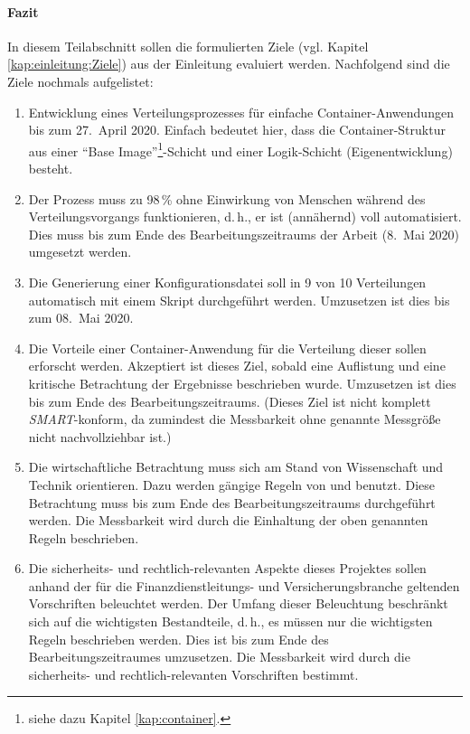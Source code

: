\paragraph{Fazit}
In diesem Teilabschnitt sollen die formulierten Ziele (vgl. Kapitel \vref{kap:einleitung:Ziele}) aus der Einleitung evaluiert werden. Nachfolgend sind die Ziele nochmals aufgelistet:

\begin{enumerate}
	\item Entwicklung eines Verteilungsprozesses für einfache Container-Anwendungen bis zum 27.~April 2020. Einfach bedeutet hier, dass die Container-Struktur aus einer \enquote{Base Image}\footnote{siehe dazu Kapitel \vref{kap:container}.}-Schicht und einer Logik-Schicht (Eigenentwicklung) besteht.
	\item Der Prozess muss zu 98\,\% ohne Einwirkung von Menschen während des Verteilungsvorgangs funktionieren, d.\,h., er ist (annähernd) voll automatisiert. Dies muss bis zum Ende des Bearbeitungszeitraums der Arbeit (8.~Mai 2020) umgesetzt werden.
	\item Die Generierung einer Konfigurationsdatei soll in 9 von 10 Verteilungen automatisch mit einem Skript durchgeführt werden. Umzusetzen ist dies bis zum 08.~Mai 2020.
	\item Die Vorteile einer Container-Anwendung für die Verteilung dieser sollen erforscht werden. Akzeptiert ist dieses Ziel, sobald eine Auflistung und eine kritische Betrachtung der Ergebnisse beschrieben wurde. Umzusetzen ist dies bis zum Ende des Bearbeitungszeitraums. (Dieses Ziel ist nicht komplett \textit{SMART}-konform, da zumindest die Messbarkeit ohne genannte Messgröße nicht nachvollziehbar ist.)
	\item Die wirtschaftliche Betrachtung muss sich am Stand von Wissenschaft und Technik orientieren. Dazu werden gängige Regeln von \cite{herman_is_2009} und \cite{brugger_it_2009} benutzt. Diese Betrachtung muss bis zum Ende des Bearbeitungszeitraums durchgeführt werden. Die Messbarkeit wird durch die Einhaltung der oben genannten Regeln beschrieben.
	\item Die sicherheits- und rechtlich-relevanten Aspekte dieses Projektes sollen anhand der für die Finanzdienstleitungs- und Versicherungsbranche geltenden Vorschriften beleuchtet werden. Der Umfang dieser Beleuchtung beschränkt sich auf die wichtigsten Bestandteile, d.\,h., es müssen nur die wichtigsten Regeln beschrieben werden. Dies ist bis zum Ende des Bearbeitungszeitraumes umzusetzen. Die Messbarkeit wird durch die sicherheits- und rechtlich-relevanten Vorschriften bestimmt.
\end{enumerate}

